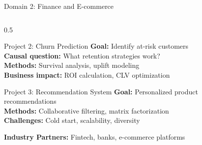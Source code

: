 \begin{frame}{Domain 2: Finance and E-commerce}
\begin{columns}
\begin{column}{0.5\textwidth}
\vspace{0.2cm}

\begin{block}{Project 2: Churn Prediction}
\textbf{Goal:} Identify at-risk customers\\
\textbf{Causal question:} What retention strategies work?\\
\textbf{Methods:} Survival analysis, uplift modeling\\
\textbf{Business impact:} ROI calculation, CLV optimization
\end{block}

\vspace{0.2cm}

\begin{block}{Project 3: Recommendation System}
\textbf{Goal:} Personalized product recommendations\\
\textbf{Methods:} Collaborative filtering, matrix factorization\\
\textbf{Challenges:} Cold start, scalability, diversity
\end{block}

\vspace{0.2cm}

\textbf{Industry Partners:} Fintech, banks, e-commerce platforms
\end{column}
\end{columns}
\end{frame}


